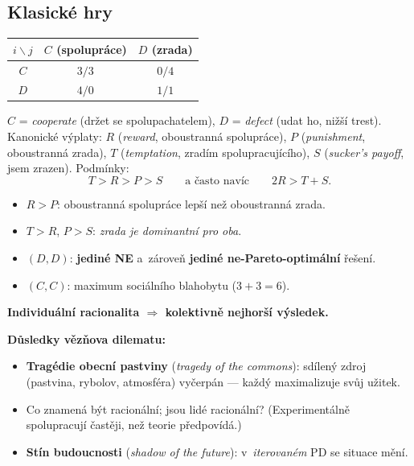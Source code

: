 \documentclass[11pt,a4paper]{article}
\theoremstyle{definition}
\begin{document}
\subsection{Klasické hry}

\begin{defbox}
\begin{center}
\begin{tabular}{c|cc}
$i \backslash j$ & $C$ (spolupráce) & $D$ (zrada) \\
\hline
$C$ & $3/3$ & $0/4$ \\
$D$ & $4/0$ & $1/1$ \\
\end{tabular}
\end{center}
$C$ = \emph{cooperate} (držet se spolupachatelem), $D$ = \emph{defect} (udat ho, nižší trest).
Kanonické výplaty: $R$ (\emph{reward}, oboustranná spolupráce), $P$ (\emph{punishment},
oboustranná zrada), $T$ (\emph{temptation}, zradím spolupracujícího), $S$ (\emph{sucker's
payoff}, jsem zrazen). Podmínky:
\[
T > R > P > S \qquad\text{a často navíc}\qquad 2R > T + S .
\]
\begin{itemize}
\item $R > P$: oboustranná spolupráce lepší než oboustranná zrada.
\item $T > R$, $P > S$: \emph{zrada je dominantní pro oba}.
\item $(D,D)$: \textbf{jediné NE} a~zároveň \textbf{jediné ne-Pareto-optimální} řešení.
\item $(C,C)$: maximum sociálního blahobytu ($3+3=6$).
\end{itemize}
\textbf{Individuální racionalita $\Rightarrow$ kolektivně nejhorší výsledek.}
\end{defbox}

\textbf{Důsledky vězňova dilematu:}
\begin{itemize}
\item \textbf{Tragédie obecní pastviny} (\emph{tragedy of the commons}): sdílený zdroj
  (pastvina, rybolov, atmosféra) vyčerpán --- každý maximalizuje svůj užitek.
\item Co znamená být racionální; jsou lidé racionální? (Experimentálně spolupracují častěji,
  než teorie předpovídá.)
\item \textbf{Stín budoucnosti} (\emph{shadow of the future}): v~\emph{iterovaném} PD se
  situace mění.
\end{itemize}
\end{document}
